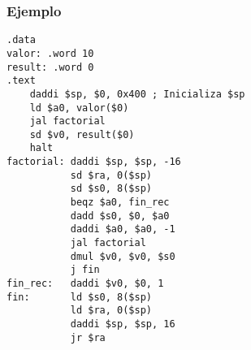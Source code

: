 \documentclass{beamer}
\begin{document}
\begin{frame}[fragile]
\frametitle{Ejemplo}
\tiny{
\begin{block}{}
\begin{lstlisting}[basicstyle=\ttfamily,keywordstyle=\color{blue}]
.data
valor: .word 10
result: .word 0
.text
    daddi $sp, $0, 0x400 ; Inicializa $sp
    ld $a0, valor($0)
    jal factorial
    sd $v0, result($0)
    halt
factorial: daddi $sp, $sp, -16
           sd $ra, 0($sp)
           sd $s0, 8($sp)
           beqz $a0, fin_rec
           dadd $s0, $0, $a0
           daddi $a0, $a0, -1
           jal factorial
           dmul $v0, $v0, $s0
           j fin		   
fin_rec:   daddi $v0, $0, 1
fin:       ld $s0, 8($sp)
           ld $ra, 0($sp)
           daddi $sp, $sp, 16
           jr $ra		   
\end{lstlisting}
\end{block}
}

\end{frame}
\end{document}

